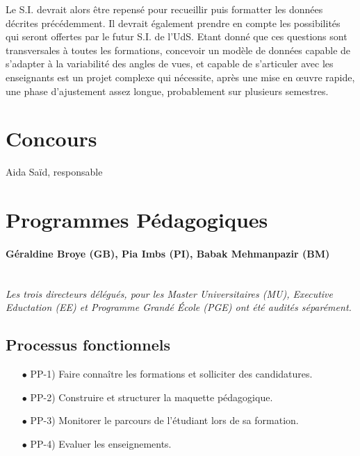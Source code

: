 \documentclass{book}
\begin{document}
Le S.I. devrait alors être repensé pour recueillir puis formatter les 
données décrites précédemment. Il devrait également prendre en compte 
les possibilités qui seront offertes par le futur S.I.  
de l'UdS. Etant donné que ces questions sont transversales à toutes les 
formations, concevoir un modèle de données capable de s'adapter à la 
variabilité des angles de vues, et capable de s'articuler avec les 
enseignants est un projet complexe qui nécessite, après une mise en 
{\oe}uvre rapide, une phase d'ajustement assez longue, probablement sur
plusieurs semestres. 





\section{Concours }
Aida Saïd, responsable


\section{Programmes Pédagogiques}
\paragraph{
Géraldine Broye (GB), %
Pia Imbs (PI),
Babak Mehmanpazir (BM)} 
~\\

\textit{Les trois directeurs délégués, pour les Master Universitaires (MU), 
Executive Eductation (EE) et Programme Grandé \'Ecole (PGE) ont été audités 
séparément.}

\subsection{Processus fonctionnels}
\label{sc:pp-process}

\begin{itemize}
\item[$\bullet$] PP-1) Faire connaître les formations et solliciter des candidatures.
\item[$\bullet$] PP-2) Construire et structurer la maquette pédagogique.
\item[$\bullet$] PP-3) Monitorer le parcours de l'étudiant lors de sa formation.
\item[$\bullet$] PP-4) Evaluer les enseignements. 
\end{itemize}
\bigskip
\end{document}
